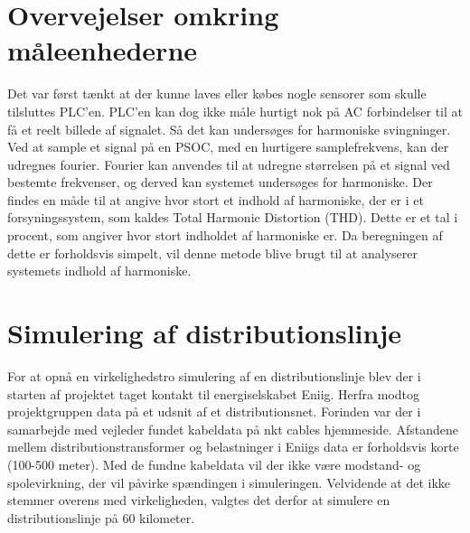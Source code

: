 \section{Overvejelser omkring måleenhederne}
Det var først tænkt at der kunne laves eller købes nogle sensorer som skulle tilsluttes PLC'en. PLC'en kan dog ikke måle hurtigt nok på AC forbindelser til at få et reelt billede af signalet. Så det kan undersøges for harmoniske svingninger. Ved at sample et signal på en PSOC, med en hurtigere samplefrekvens, kan der udregnes fourier. Fourier kan anvendes til at udregne størrelsen på et signal ved bestemte frekvenser, og derved kan systemet undersøges for harmoniske. Der findes en måde til at angive hvor stort et indhold af harmoniske, der er i et forsyningssystem, som kaldes Total Harmonic Distortion (THD). Dette er et tal i procent, som angiver hvor stort indholdet af harmoniske er. Da beregningen af dette er forholdsvis simpelt, vil denne metode blive brugt til at analyserer systemets indhold af harmoniske. 

\section{Simulering af distributionslinje}
For at opnå en virkelighedstro simulering af en distributionslinje blev der i starten af projektet taget kontakt til energiselskabet Eniig. Herfra modtog projektgruppen data på et udsnit af et distributionsnet. Forinden var der i samarbejde med vejleder fundet kabeldata på nkt cables hjemmeside. Afstandene mellem distributionstransformer og belastninger i Eniigs data er forholdsvis korte (100-500 meter). Med de fundne kabeldata vil der ikke være modstand- og spolevirkning, der vil påvirke spændingen i simuleringen. Velvidende at det ikke stemmer overens med virkeligheden, valgtes det derfor at simulere en distributionslinje på 60 kilometer. 



